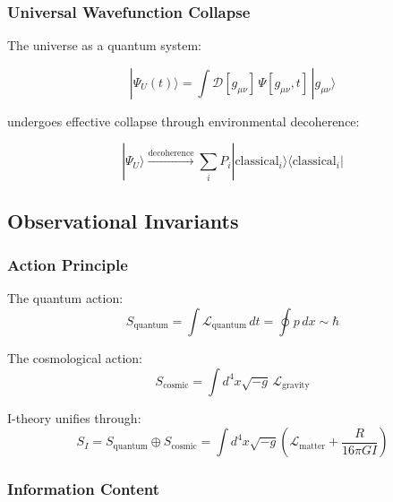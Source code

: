 \subsubsection{Universal Wavefunction Collapse}

The universe as a quantum system:

\begin{equation}
\label{eq:universe_wavefunction}
|\Psi_U(t)\rangle = \int \mathcal{D}[g_{\mu\nu}] \, \Psi[g_{\mu\nu}, t] \, |g_{\mu\nu}\rangle
\end{equation}

undergoes effective collapse through environmental decoherence:

\begin{equation}
\label{eq:universe_collapse}
|\Psi_U\rangle \xrightarrow{\text{decoherence}} \sum_i P_i |\text{classical}_i\rangle \langle \text{classical}_i|
\end{equation}

\subsection{Observational Invariants}

\subsubsection{Action Principle}

The quantum action:
\begin{equation}
\label{eq:quantum_action}
S_{\text{quantum}} = \int \mathcal{L}_{\text{quantum}} \, dt = \oint p \, dx \sim \hbar
\end{equation}

The cosmological action:
\begin{equation}
\label{eq:cosmic_action}
S_{\text{cosmic}} = \int d^4x \sqrt{-g} \, \mathcal{L}_{\text{gravity}}
\end{equation}

I-theory unifies through:
\begin{equation}
\label{eq:i_action}
S_I = S_{\text{quantum}} \oplus S_{\text{cosmic}} = \int d^4x \sqrt{-g} \left(\mathcal{L}_{\text{matter}} + \frac{R}{16\pi G I}\right)
\end{equation}

\subsubsection{Information Content}


